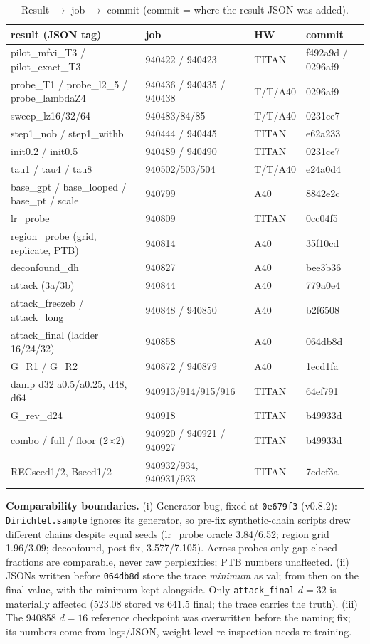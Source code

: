 \documentclass[10pt,a4paper]{article}
\begin{document}
\begin{table}[h]\centering\footnotesize
\caption{Result $\to$ job $\to$ commit (commit = where the result JSON was added).}
\begin{tabular}{llll}
\toprule
result (JSON tag) & job & HW & commit\\
\midrule
pilot\_mfvi\_T3 / pilot\_exact\_T3 & 940422 / 940423 & TITAN & f492a9d / 0296af9\\
probe\_T1 / probe\_l2\_5 / probe\_lambdaZ4 & 940436 / 940435 / 940438 & T/T/A40 & 0296af9\\
sweep\_lz16/32/64 & 940483/84/85 & T/T/A40 & 0231ce7\\
step1\_nob / step1\_withb & 940444 / 940445 & TITAN & e62a233\\
init0.2 / init0.5 & 940489 / 940490 & TITAN & 0231ce7\\
tau1 / tau4 / tau8 & 940502/503/504 & T/T/A40 & e24a0d4\\
base\_gpt / base\_looped / base\_pt / scale & 940799 & A40 & 8842e2c\\
lr\_probe & 940809 & TITAN & 0cc04f5\\
region\_probe (grid, replicate, PTB) & 940814 & A40 & 35f10cd\\
deconfound\_dh & 940827 & A40 & bee3b36\\
attack (3a/3b) & 940844 & A40 & 779a0e4\\
attack\_freezeb / attack\_long & 940848 / 940850 & A40 & b2f6508\\
attack\_final (ladder 16/24/32) & 940858 & A40 & 064db8d\\
G\_R1 / G\_R2 & 940872 / 940879 & A40 & 1ecd1fa\\
damp d32 a0.5/a0.25, d48, d64 & 940913/914/915/916 & TITAN & 64ef791\\
G\_rev\_d24 & 940918 & TITAN & b49933d\\
combo / full / floor (2$\times$2) & 940920 / 940921 / 940927 & TITAN & b49933d\\
RECseed1/2, Bseed1/2 & 940932/934, 940931/933 & TITAN & 7cdcf3a\\
\bottomrule
\end{tabular}
\end{table}

\textbf{Comparability boundaries.} (i) Generator bug, fixed at \texttt{0e679f3} (v0.8.2):
\texttt{Dirichlet.sample} ignores its generator, so pre-fix synthetic-chain scripts drew
different chains despite equal seeds (lr\_probe oracle 3.84/6.52; region grid 1.96/3.09;
deconfound, post-fix, 3.577/7.105). Across probes only gap-closed fractions are comparable,
never raw perplexities; PTB numbers unaffected. (ii) JSONs written before \texttt{064db8d}
store the trace \emph{minimum} as val; from then on the final value, with the minimum kept
alongside. Only \texttt{attack\_final} $d{=}32$ is materially affected (523.08 stored vs
641.5 final; the trace carries the truth). (iii) The 940858 $d{=}16$ reference checkpoint
was overwritten before the naming fix; its numbers come from logs/JSON, weight-level
re-inspection needs re-training.
\end{document}
